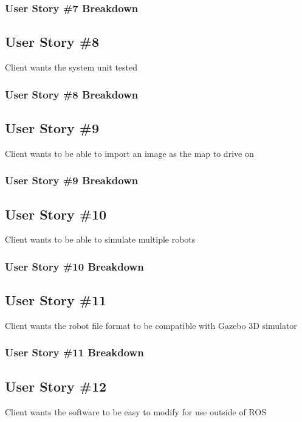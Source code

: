 \subsubsection{User Story \#7 Breakdown}

\subsection{User Story \#8} 
Client wants the system unit tested

\subsubsection{User Story \#8 Breakdown}

\subsection{User Story \#9} 
Client wants to be able to import an image as the map to drive on

\subsubsection{User Story \#9 Breakdown}

\subsection{User Story \#10} 
Client wants to be able to simulate multiple robots

\subsubsection{User Story \#10 Breakdown}

\subsection{User Story \#11} 
Client wants the robot file format to be compatible with Gazebo 3D simulator

\subsubsection{User Story \#11 Breakdown}

\subsection{User Story \#12} 
Client wants the software to be easy to modify for use outside of ROS

